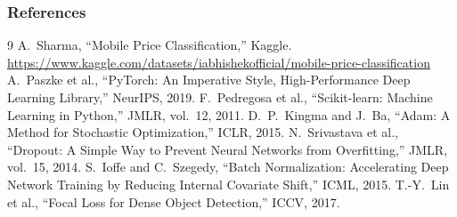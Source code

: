 \documentclass{beamer}
\begin{document}
\begin{frame}[allowframebreaks]
    \frametitle{References}
    \footnotesize
    \begin{thebibliography}{9}
         A.\ Sharma, ``Mobile Price Classification,'' Kaggle. \url{https://www.kaggle.com/datasets/iabhishekofficial/mobile-price-classification}
         A.\ Paszke et al., ``PyTorch: An Imperative Style, High-Performance Deep Learning Library,'' NeurIPS, 2019.
         F.\ Pedregosa et al., ``Scikit-learn: Machine Learning in Python,'' JMLR, vol.\ 12, 2011.
         D.\ P.\ Kingma and J.\ Ba, ``Adam: A Method for Stochastic Optimization,'' ICLR, 2015.
         N.\ Srivastava et al., ``Dropout: A Simple Way to Prevent Neural Networks from Overfitting,'' JMLR, vol.\ 15, 2014.
         S.\ Ioffe and C.\ Szegedy, ``Batch Normalization: Accelerating Deep Network Training by Reducing Internal Covariate Shift,'' ICML, 2015.
         T.-Y.\ Lin et al., ``Focal Loss for Dense Object Detection,'' ICCV, 2017.
    \end{thebibliography}
\end{frame}
\end{document}
